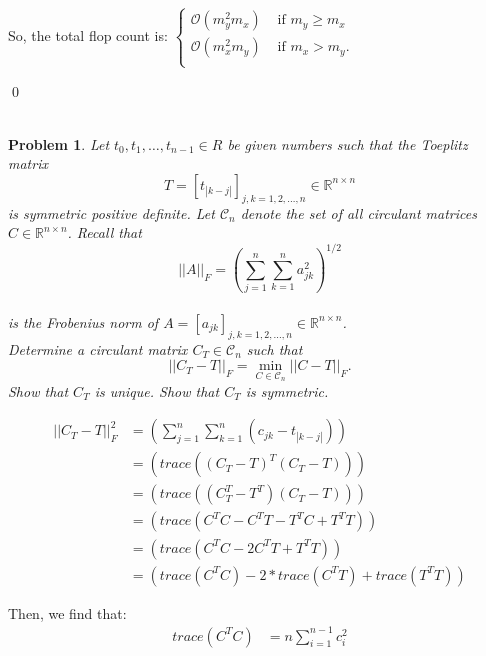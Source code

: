 \documentclass[12pt]{article}
\newtheorem{problem}{Problem}
\def\R{\mathbb{R}}
\begin{document}
\begin{itemize}
So, the total flop count is: $\begin{cases}
				\mathcal{O}(m_y^2m_x) & \text{ if } m_y \geq m_x \\
				\mathcal{O}(m_x^2m_y) & \text{ if } m_x > m_y. \\
										\end{cases}$
\end{itemize}
\qed\\\\





\bigskip\bigskip
\noindent
\begin{problem}  Let $t_0, t_1, \dots , t_{n-1} \in R$ be given numbers such that the Toeplitz matrix
$$T = \left[t_{|k-j|}\right]_{j,k=1,2,\dots,n} \in \R^{n\times n}$$
is symmetric positive definite.  Let $\mathcal{C}_n$ denote the set of all circulant matrices $C \in \R^{n\times n}$.  Recall that
$$||A||_F = \left(\sum\limits_{j=1}^n\sum\limits_{k=1}^n a^2_{jk}\right)^{1/2}$$\\
\noindent
is the Frobenius norm of $A = \left[a_{jk}\right]_{j,k=1,2,\dots,n} \in \R^{n\times n}$.\\

\noindent
Determine a circulant matrix $C_T \in \mathcal{C}_n$ such that
$$||C_T - T||_F = \min\limits_{C \in \mathcal{C}_n} ||C - T||_F.$$
\noindent
Show that $C_T$ is unique.  Show that $C_T$ is symmetric.\\
\end{problem}

\begin{align}
||C_T - T||_F^2 &= \left(\sum\limits_{j=1}^n\sum\limits_{k=1}^n (c_{jk} - t_{|k-j|})\right) \nonumber \\
&= \left(trace((C_T - T)^T(C_T - T))\right) \nonumber \\
&= \left(trace((C_T^T - T^T)(C_T - T))\right) \nonumber \\
& = \left(trace(C^TC - C^TT - T^TC + T^TT)\right) \nonumber \\
& = \left(trace(C^TC - 2C^TT + T^TT)\right) \nonumber \\
&= \left(trace(C^TC) - 2*trace(C^TT) + trace(T^TT)\right) \nonumber
\end{align}

\noindent
Then, we find that:
\begin{align}
trace(C^TC) &= n\sum\limits_{i=1}^{n-1} c_i^2 
\end{align}
\end{document}
